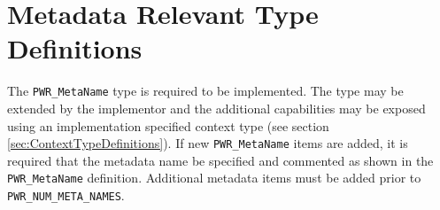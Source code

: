 

\section{Metadata Relevant Type Definitions}\label{sec:MetadataTypeDefinitions}

The \texttt{PWR_MetaName} type is required to be implemented. 
The type may be extended by the implementor and the additional capabilities may be exposed using an implementation specified context type (see section \ref{sec:ContextTypeDefinitions}).
If new \texttt{PWR_MetaName} items are added, it is required that the metadata name be specified and commented as shown in the \texttt{PWR_MetaName} definition. 
Additional metadata items must be added prior to \texttt{PWR_NUM_META_NAMES}.



